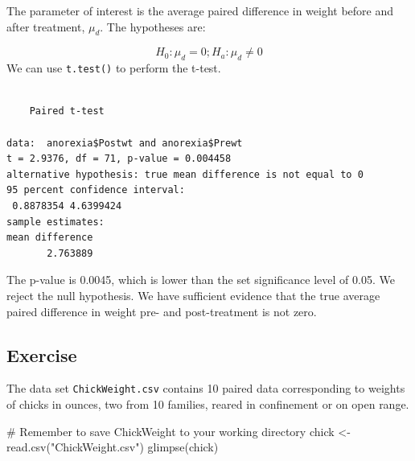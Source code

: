 \documentclass[
  letterpaper,
  DIV=11,
  numbers=noendperiod]{scrartcl}
\newenvironment{Shaded}{\begin{snugshade}}{\end{snugshade}}
\newcommand{\AttributeTok}[1]{\textcolor[rgb]{0.40,0.45,0.13}{#1}}
\newcommand{\CommentTok}[1]{\textcolor[rgb]{0.37,0.37,0.37}{#1}}
\newcommand{\ConstantTok}[1]{\textcolor[rgb]{0.56,0.35,0.01}{#1}}
\newcommand{\DecValTok}[1]{\textcolor[rgb]{0.68,0.00,0.00}{#1}}
\newcommand{\FunctionTok}[1]{\textcolor[rgb]{0.28,0.35,0.67}{#1}}
\newcommand{\NormalTok}[1]{\textcolor[rgb]{0.00,0.23,0.31}{#1}}
\newcommand{\OtherTok}[1]{\textcolor[rgb]{0.00,0.23,0.31}{#1}}
\newcommand{\SpecialCharTok}[1]{\textcolor[rgb]{0.37,0.37,0.37}{#1}}
\newcommand{\StringTok}[1]{\textcolor[rgb]{0.13,0.47,0.30}{#1}}
\begin{document}
The parameter of interest is the average paired difference in weight
before and after treatment, \(\mu_d\). The hypotheses are:

\[
H_0: \mu_d = 0; H_a: \mu_d \neq 0
\] We can use \texttt{t.test()} to perform the t-test.

\begin{Shaded}
\end{Shaded}

\begin{verbatim}

    Paired t-test

data:  anorexia$Postwt and anorexia$Prewt
t = 2.9376, df = 71, p-value = 0.004458
alternative hypothesis: true mean difference is not equal to 0
95 percent confidence interval:
 0.8878354 4.6399424
sample estimates:
mean difference 
       2.763889 
\end{verbatim}

The p-value is 0.0045, which is lower than the set significance level of
0.05. We reject the null hypothesis. We have sufficient evidence that
the true average paired difference in weight pre- and post-treatment is
not zero.

\subsection{Exercise}\label{exercise-4}

The data set \texttt{ChickWeight.csv} contains 10 paired data
corresponding to weights of chicks in ounces, two from 10 families,
reared in confinement or on open range.

\begin{Shaded}
\begin{Highlighting}[]
\CommentTok{\# Remember to save ChickWeight to your working directory}
\NormalTok{chick }\OtherTok{\textless{}{-}} \FunctionTok{read.csv}\NormalTok{(}\StringTok{"ChickWeight.csv"}\NormalTok{)}
\FunctionTok{glimpse}\NormalTok{(chick)}
\end{Highlighting}
\end{Shaded}
\end{document}
